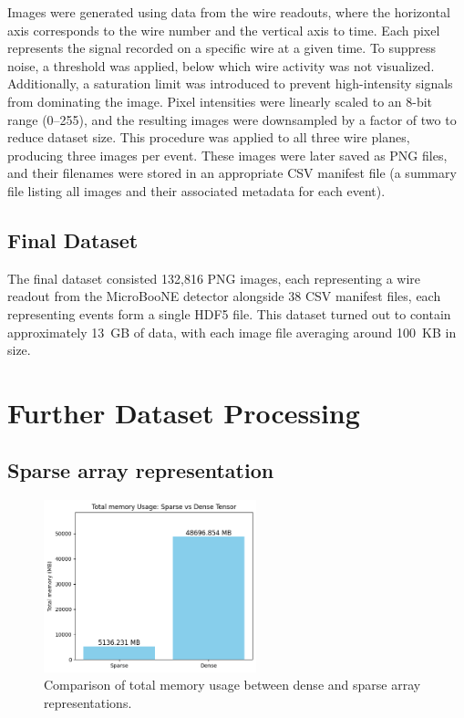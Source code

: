 \documentclass{pracalicmgr}
\begin{document}
Images were generated using data from the wire readouts, where the horizontal axis corresponds to the wire number and the vertical axis to time. Each pixel represents the signal recorded on a specific wire at a given time. To suppress noise, a threshold was applied, below which wire activity was not visualized. Additionally, a saturation limit was introduced to prevent high-intensity signals from dominating the image. Pixel intensities were linearly scaled to an 8-bit range (0--255), and the resulting images were downsampled by a factor of two to reduce dataset size. This procedure was applied to all three wire planes, producing three images per event. These images were later saved as PNG files, and their filenames were stored in an appropriate CSV manifest file (a summary file listing all images and their associated metadata for each event).

\subsection{Final Dataset}

The final dataset consisted 132,816 PNG images, each representing a wire readout from the MicroBooNE detector alongside 38 CSV manifest files, each representing events form a single HDF5 file. This dataset turned out to contain approximately 13~GB of data, with each image file averaging around 100~KB in size.

\section{Further Dataset Processing}

\subsection{Sparse array representation}

\begin{figure}[H]
    \centering
    \includegraphics[width=0.55\textwidth]{src/totalSparseDense.png}
    \caption{Comparison of total memory usage between dense and sparse array representations.}
    \label{fig:memRedTot}
\end{figure}
\end{document}
